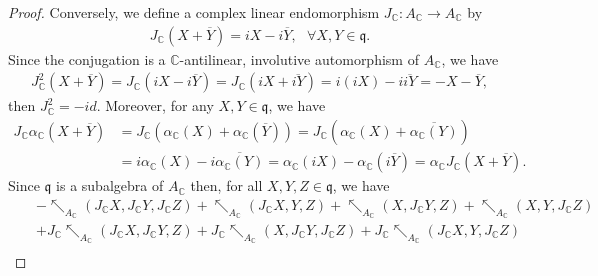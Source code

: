 \documentclass[a4paper,11pt]{article}
\def\a{\alpha}
\def\nw{\nwarrow}
\theoremstyle{definition}
\begin{document}
\begin{proof}

Conversely, we define a complex linear endomorphism $J_{\mathbb C}: A_{\mathbb C}\to A_{\mathbb C}$ by
\begin{eqnarray}\label{defi-complex-structure}
J_{\mathbb C}(X+\overline{Y})=iX-i\overline{Y},\,\,\,\,\forall X,Y\in\mathfrak{q}.
\end{eqnarray}
Since the conjugation  is a $\mathbb C$-antilinear, involutive automorphism of $ A_{\mathbb C}$, we have
\begin{eqnarray*}
J_{\mathbb C}^2(X+\overline{Y})=J_{\mathbb C}(iX-i\overline{Y})=J_{\mathbb C}(iX+\overline{iY})=i(iX)-i\overline{iY}=-X-\overline{Y},
\end{eqnarray*}
then $J_{\mathbb C}^2=-id$. Moreover, for any $X,Y\in\mathfrak{q}$, we have
\begin{align*}
J_{\mathbb C}\a_{\mathbb C}(X+\overline{Y})&=J_{\mathbb C}(\a_{\mathbb C}(X)+\a_{\mathbb C}(\overline{Y}))=J_{\mathbb C}(\a_{\mathbb C}(X)+\overline{\a_{\mathbb C}(Y)})\\&=i\a_{\mathbb C}(X)-i\overline{\a_{\mathbb C}(Y)}=\a_{\mathbb C}(i X)-\a_{\mathbb C}(i\overline{Y})=\a_{\mathbb C}J_{\mathbb C}(X+\overline{Y}).\end{align*}
Since $\mathfrak{q}$ is a subalgebra of $ A_{\mathbb C}$ then,  for all $X,Y,Z\in\mathfrak{q}$, we have
\begin{eqnarray*}
&&-\nw_{ A_{\mathbb C}}(J_{\mathbb C}X,J_{\mathbb C}Y,J_{\mathbb C}Z)+\nw_{ A_{\mathbb C}}(J_{\mathbb C}X,Y,Z)+\nw_{ A_{\mathbb C}}(X,J_{\mathbb C}Y,Z)+\nw_{ A_{\mathbb C}}(X,Y,J_{\mathbb C}Z)\\
&&+J_{\mathbb C}\nw_{ A_{\mathbb C}}(J_{\mathbb C}X,J_{\mathbb C}Y,Z)+J_{\mathbb C}\nw_{ A_{\mathbb C}}(X,J_{\mathbb C}Y,J_{\mathbb C}Z)+J_{\mathbb C}\nw_{ A_{\mathbb C}}(J_{\mathbb C}X,Y,J_{\mathbb C}Z)\\

\end{eqnarray*}
\end{proof}
\end{document}
